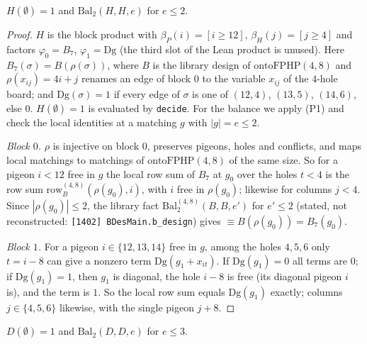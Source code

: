 \begin{lemma}\label{lem:C-H}
$H(\emptyset)=1$ and $\mathrm{Bal}_2(H,H,e)$ for $e\le2$.
\end{lemma}

\begin{proof}
$H$ is the block product with $\beta_P(i)=[i\ge12]$, $\beta_H(j)=[j\ge4]$ and factors
$\varphi_0=B_7$, $\varphi_1=\mathrm{Dg}$ (the third slot of the Lean product is unused).  Here
$B_7(\sigma)=B(\rho(\sigma))$, where $B$ is the library design of $\mathrm{ontoFPHP}(4,8)$ and
$\rho(x_{ij})=4i+j$ renames an edge of block $0$ to the variable $x_{ij}$ of the $4$-hole
board; and $\mathrm{Dg}(\sigma)=1$ if every edge of $\sigma$ is one of $(12,4)$, $(13,5)$,
$(14,6)$, else $0$.  $H(\emptyset)=1$ is evaluated by
\texttt{decide}.  For the balance we apply (P1) and check the local identities at a matching
$g$ with $|g|=e\le2$.

\emph{Block $0$.}  $\rho$ is injective on block $0$, preserves pigeons, holes and conflicts,
and maps local matchings to matchings of $\mathrm{ontoFPHP}(4,8)$ of the same size.  So for a
pigeon $i<12$ free in $g$ the local row sum of $B_7$ at $g_0$ over the holes $t<4$ is the row
sum $\mathrm{row}^{(4,8)}_B(\rho(g_0),i)$, with $i$ free in $\rho(g_0)$; likewise for columns
$j<4$.  Since
$|\rho(g_0)|\le2$, the library fact $\mathrm{Bal}^{(4,8)}_2(B,B,e')$ for $e'\le2$ (stated,
not reconstructed: \texttt{[1402] BDesMain.b\_design}) gives $\equiv B(\rho(g_0))=B_7(g_0)$.

\emph{Block $1$.}  For a pigeon $i\in\{12,13,14\}$ free in $g$, among the holes $4,5,6$ only
$t=i-8$ can give a nonzero term $\mathrm{Dg}(g_1+x_{it})$.  If $\mathrm{Dg}(g_1)=0$ all terms are
$0$; if $\mathrm{Dg}(g_1)=1$, then $g_1$ is diagonal, the hole $i-8$ is free (its diagonal
pigeon $i$ is), and the term is $1$.  So the local row sum equals $\mathrm{Dg}(g_1)$ exactly;
columns $j\in\{4,5,6\}$ likewise, with the single pigeon $j+8$.
\end{proof}

\begin{lemma}\label{lem:C-D}
$D(\emptyset)=1$ and $\mathrm{Bal}_2(D,D,e)$ for $e\le3$.
\end{lemma}

